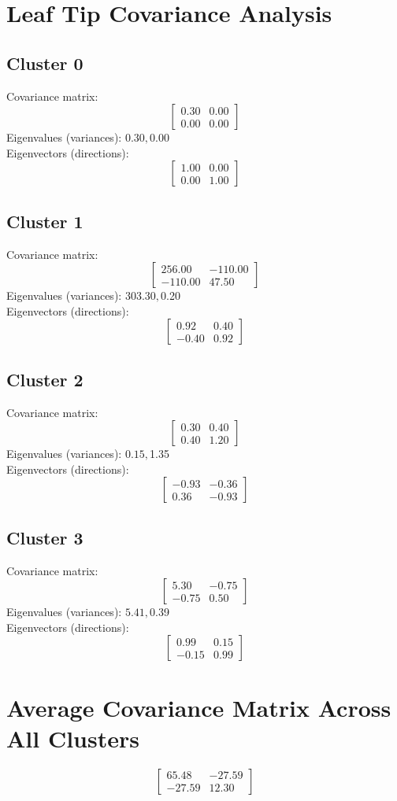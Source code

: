 \documentclass{article}
\begin{document}
\section*{Leaf Tip Covariance Analysis}
\subsection*{Cluster 0}
Covariance matrix:
\[\begin{bmatrix}0.30 & 0.00 \\0.00 & 0.00\end{bmatrix}\]
Eigenvalues (variances): $ 0.30, $0.00\\
Eigenvectors (directions):
\[\begin{bmatrix}1.00 & 0.00 \\0.00 & 1.00\end{bmatrix}\]
\subsection*{Cluster 1}
Covariance matrix:
\[\begin{bmatrix}256.00 & -110.00 \\-110.00 & 47.50\end{bmatrix}\]
Eigenvalues (variances): $ 303.30, $0.20\\
Eigenvectors (directions):
\[\begin{bmatrix}0.92 & 0.40 \\-0.40 & 0.92\end{bmatrix}\]
\subsection*{Cluster 2}
Covariance matrix:
\[\begin{bmatrix}0.30 & 0.40 \\0.40 & 1.20\end{bmatrix}\]
Eigenvalues (variances): $ 0.15, $1.35\\
Eigenvectors (directions):
\[\begin{bmatrix}-0.93 & -0.36 \\0.36 & -0.93\end{bmatrix}\]
\subsection*{Cluster 3}
Covariance matrix:
\[\begin{bmatrix}5.30 & -0.75 \\-0.75 & 0.50\end{bmatrix}\]
Eigenvalues (variances): $ 5.41, $0.39\\
Eigenvectors (directions):
\[\begin{bmatrix}0.99 & 0.15 \\-0.15 & 0.99\end{bmatrix}\]
\section*{Average Covariance Matrix Across All Clusters}
\[\begin{bmatrix}65.48 & -27.59 \\-27.59 & 12.30\end{bmatrix}\]
\end{document}
